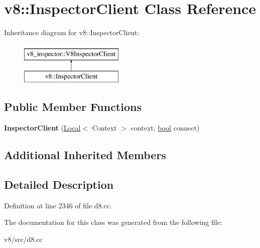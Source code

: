 \hypertarget{classv8_1_1InspectorClient}{}\section{v8\+:\+:Inspector\+Client Class Reference}
\label{classv8_1_1InspectorClient}
Inheritance diagram for v8\+:\+:Inspector\+Client\+:\begin{figure}[H]
\begin{center}
\leavevmode
\includegraphics[height=2.000000cm]{classv8_1_1InspectorClient}
\end{center}
\end{figure}
\subsection*{Public Member Functions}
\begin{DoxyCompactItemize}
\item 
\mbox{\label{classv8_1_1InspectorClient_ab77d07c601e7d31fecb87639b40e0a01}} 
{\bfseries Inspector\+Client} (\mbox{\hyperlink{classv8_1_1Local}{Local}}$<$ Context $>$ context, \mbox{\hyperlink{classbool}{bool}} connect)
\end{DoxyCompactItemize}
\subsection*{Additional Inherited Members}


\subsection{Detailed Description}


Definition at line 2346 of file d8.\+cc.



The documentation for this class was generated from the following file\+:\begin{DoxyCompactItemize}
\item 
v8/src/d8.\+cc\end{DoxyCompactItemize}
